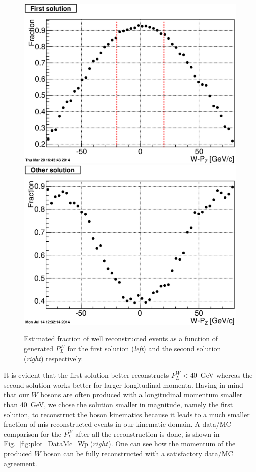 \documentclass[12pt]{article}
\begin{document}
\begin{figure}[htbp]
\begin{center}
\includegraphics[scale=0.4]{images/P_long_study/hWBosonPz_GoodRecoFraction}
\includegraphics[scale=0.4]{images/P_long_study/hWBosonPz_GoodRecoFraction_OtherSol}
\end{center}
\caption{Estimated fraction of well reconstructed events as a function of generated $P^{W}_{L}$ for the first solution ({\it left}) and the second solution ({\it right}) respectively.}
\label{fig:plot_hWBosonPz_GoodRecoFraction} 
\end{figure}

It is evident that the first solution better reconstructs  $P^{W}_{L}<40$~GeV whereas the second solution works better for larger longitudinal momenta.  
Having in mind that our $W$ bosons are often produced with a longitudinal momentum smaller than 40~GeV, we chose the solution smaller in magnitude, namely the first solution, to reconstruct the boson kinematics because it leads to a much smaller fraction of mis-reconstructed events in our kinematic domain. A data/MC comparison for the $P^{W}_{L}$ after all the reconstruction is done, is shown in Fig.~\ref{fig:plot_DataMc_Wp}($right$). One can see how the momentum of the produced $W$ boson can be fully reconstructed with a satisfactory data/MC agreement. 
\end{document}
